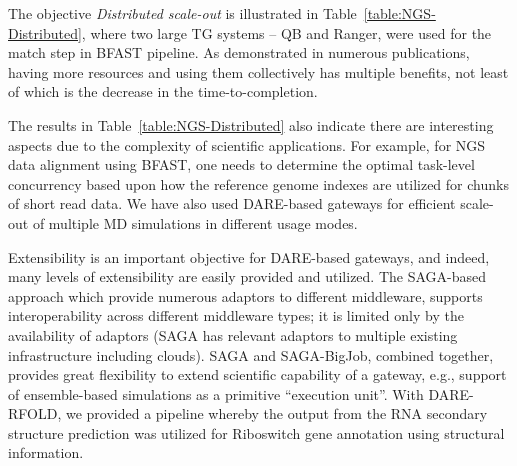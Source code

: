 \documentclass[]{article}
\begin{document}
The objective {\it Distributed scale-out} is illustrated in
Table~\ref{table:NGS-Distributed}, where two large TG systems -- QB
and Ranger, were used for the match step in BFAST pipeline.  As
demonstrated in numerous publications, having more resources and using
them collectively has multiple benefits, not least of which is the
decrease in the time-to-completion.


The results in Table~\ref{table:NGS-Distributed} also indicate there
are interesting aspects due to the complexity of scientific
applications.  For example, for NGS data alignment using BFAST, one
needs to determine the optimal task-level concurrency based upon how
the reference genome indexes are utilized for chunks of short read
data\cite{ecmls11}. We have also used DARE-based gateways for
efficient scale-out of multiple MD simulations in different usage
modes.



Extensibility is an important objective for DARE-based gateways, and
indeed, many levels of extensibility are easily provided and utilized.
The SAGA-based approach which provide numerous adaptors to different
middleware, supports interoperability across different middleware
types; it is limited only by the availability of adaptors (SAGA has
relevant adaptors to multiple existing infrastructure including
clouds). SAGA and SAGA-BigJob, combined together,
provides great flexibility to extend scientific capability of a
gateway, e.g., support of ensemble-based simulations as a primitive
``execution unit''. With DARE-RFOLD, we provided a pipeline whereby
the output from the RNA secondary structure prediction
was utilized for Riboswitch gene annotation using structural
information. %
\end{document}
